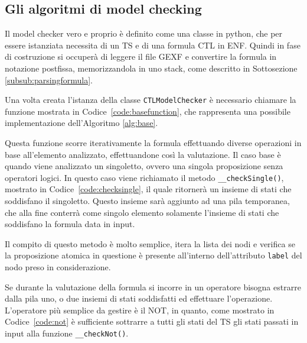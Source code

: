 \documentclass[a4paper, 10pt]{article}
\numberwithin{equation}{theor}
\begin{document}
\subsection{Gli algoritmi di model checking}
Il model checker vero e proprio è definito come una classe in python, che per essere istanziata necessita di un \ac{TS} e di una formula \ac{CTL} in ENF. Quindi in fase di costruzione si occuperà di leggere il file \ac{GEXF} e convertire la formula in notazione postfissa, memorizzandola in uno stack, come descritto in Sottosezione \ref{subsub:parsingformula}.\par
Una volta creata l'istanza della classe \texttt{CTLModelChecker} è necessario chiamare la funzione mostrata in Codice~\ref{code:basefunction}, che rappresenta una possibile implementazione dell'Algoritmo \ref{alg:base}.

Questa funzione scorre iterativamente la formula effettuando diverse operazioni in base all'elemento analizzato, effettuandone così la valutazione.
Il caso base è quando viene analizzato un singoletto, ovvero una singola proposizione senza operatori logici. In questo caso viene richiamato il metodo \texttt{__checkSingle()}, mostrato in Codice~\ref{code:checksingle}, il quale ritornerà un insieme di stati che soddisfano il singoletto. Questo insieme sarà aggiunto ad una pila temporanea, che alla fine conterrà come singolo elemento solamente l'insieme di stati che soddisfano la formula data in input.

Il compito di questo metodo è molto semplice, itera la lista dei nodi e verifica se la proposizione atomica in questione è presente all'interno dell'attributo \texttt{label} del nodo preso in considerazione.\par
Se durante la valutazione della formula si incorre in un operatore bisogna estrarre dalla pila uno, o due insiemi di stati soddisfatti ed effettuare l'operazione. L'operatore più semplice da gestire è il NOT, in quanto, come mostrato in Codice~\ref{code:not} è sufficiente sottrarre a tutti gli stati del \ac{TS} gli stati passati in input alla funzione \texttt{__checkNot()}.

\end{document}
